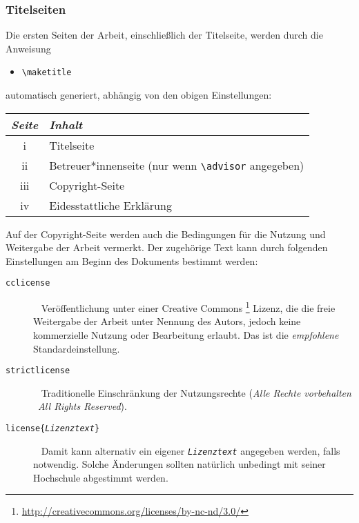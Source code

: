 \subsubsection{Titelseiten}

Die ersten Seiten der Arbeit, einschließlich der Titelseite,
werden durch die Anweisung
\begin{itemize}
\item[] \verb!\maketitle!  
\end{itemize}
automatisch generiert, abhängig von den obigen Einstellungen:
%
\begin{center}
\begin{tabular}{cl}
\emph{Seite} & \emph{Inhalt} \\
  \hline
  \textrm{i} & Titelseite  \\
  \textrm{ii} & Betreuer*innenseite (nur wenn \verb!\advisor! angegeben) \\
	\textrm{iii} & Copyright-Seite \\
  \textrm{iv} & Eidesstattliche Erklärung \\
  \hline
\end{tabular}
\end{center}
%
Auf der Copyright-Seite werden auch die Bedingungen für die Nutzung 
und Weitergabe der Arbeit vermerkt. Der zugehörige Text kann durch
folgenden Einstellungen am Beginn des Dokuments bestimmt werden:
%
\begin{description}
\item[\normalfont\texttt{{\bs}cclicense}] ~ \newline
	Veröffentlichung unter einer Creative Commons%
	\footnote{\url{http://creativecommons.org/licenses/by-nc-nd/3.0/}}
	Lizenz, die die freie Weitergabe der Arbeit unter Nennung des Autors, jedoch
	keine kommerzielle Nutzung oder Bearbeitung erlaubt.
	Das ist die \emph{empfohlene} Standardeinstellung.
\item[\normalfont\texttt{{\bs}strictlicense}] ~ \newline 
	Traditionelle Einschränkung der Nutzungsrechte 
	(\emph{Alle Rechte vorbehalten} \bzw\ \emph{All Rights Reserved}).
\item[\normalfont\texttt{{\bs}license\{\emph{Lizenztext}\}}] ~ \newline
	Damit kann alternativ ein eigener \texttt{\emph{Lizenztext}} angegeben werden, 
	falls notwendig. Solche Änderungen sollten natürlich unbedingt mit seiner 
	Hochschule abgestimmt werden.
\end{description}





